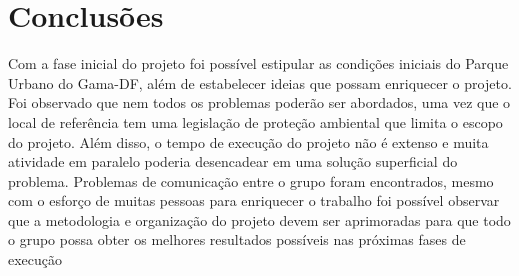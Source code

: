 \chapter[Conclusões]{Conclusões}

Com a fase inicial do projeto foi poss\'ivel estipular as condi\c{c}\~oes iniciais do Parque Urbano do Gama-DF, al\'em de estabelecer ideias que possam enriquecer o projeto. Foi observado que nem todos os problemas poder\~ao ser abordados, uma vez que o local de refer\^encia tem uma legisla\c{c}\~ao de prote\c{c}\~ao ambiental que limita o escopo do projeto. Al\'em disso, o tempo de execu\c{c}\~ao do projeto n\~ao \'e extenso e muita atividade em paralelo poderia desencadear em uma solu\c{c}\~ao superficial do problema. Problemas de comunica\c{c}\~ao entre o grupo foram encontrados, mesmo com o esfor\c{c}o de muitas pessoas para enriquecer o trabalho foi poss\'ivel observar que a metodologia e organiza\c{c}\~ao do projeto devem ser aprimoradas para que todo o grupo possa obter os melhores resultados poss\'iveis nas pr\'oximas fases de execu\c{c}\~ ao 
